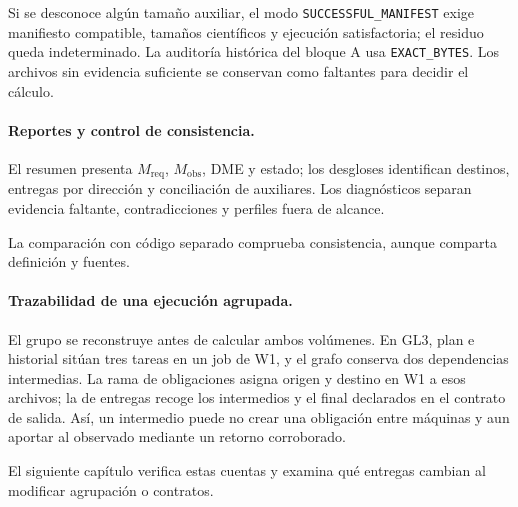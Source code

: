 Si se desconoce algún tamaño auxiliar, el modo \texttt{SUCCESSFUL\_MANIFEST} exige manifiesto compatible, tamaños científicos y ejecución satisfactoria; el residuo queda indeterminado. La auditoría histórica del bloque A usa \texttt{EXACT\_BYTES}. Los archivos sin evidencia suficiente se conservan como faltantes para decidir el cálculo.

\paragraph{Reportes y control de consistencia.}
El resumen presenta $M_{\mathrm{req}}$, $M_{\mathrm{obs}}$, DME y estado; los desgloses identifican destinos, entregas por dirección y conciliación de auxiliares. Los diagnósticos separan evidencia faltante, contradicciones y perfiles fuera de alcance.

La comparación con código separado comprueba consistencia, aunque comparta definición y fuentes.

\paragraph{Trazabilidad de una ejecución agrupada.}
\label{sec:traza_impl}
El grupo se reconstruye antes de calcular ambos volúmenes. En GL3, plan e historial sitúan tres tareas en un job de W1, y el grafo conserva dos dependencias intermedias. La rama de obligaciones asigna origen y destino en W1 a esos archivos; la de entregas recoge los intermedios y el final declarados en el contrato de salida. Así, un intermedio puede no crear una obligación entre máquinas y aun aportar al observado mediante un retorno corroborado.



El siguiente capítulo verifica estas cuentas y examina qué entregas cambian al modificar agrupación o contratos.
